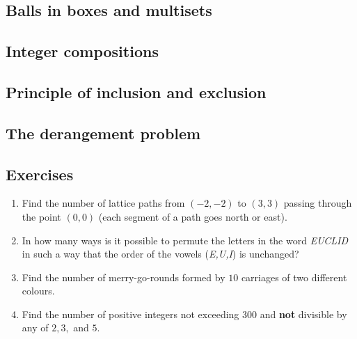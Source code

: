 \subsection{Balls in boxes and multisets}

\subsection{Integer compositions}

\subsection{Principle of inclusion and exclusion}

\subsection{The derangement problem}

\subsection{Exercises}

\begin{enumerate}
    \item Find the number of lattice paths from $(-2, -2)$ to $(3,3)$ passing through the point $(0,0)$ (each segment of a path goes north or east).
    \item In how many ways is it possible to permute the letters in the word \textit{EUCLID} in such a way that the order of the vowels (\textit{E,U,I}) is unchanged?
    \item Find the number of merry-go-rounds formed by $10$ carriages of two different colours.
    \item Find the number of positive integers not exceeding $300$ and \textbf{not} divisible by any of $2,3,$ and $5$.
\end{enumerate}